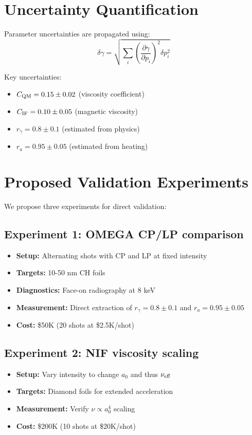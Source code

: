\documentclass[aps,pre,twocolumn,showpacs,superscriptaddress]{revtex4-2}
\theoremstyle{definition}
\begin{document}
\section{Uncertainty Quantification}\label{sec:uncertainty}

Parameter uncertainties are propagated using:
\begin{equation}
\delta\gamma = \sqrt{\sum_i \left(\frac{\partial\gamma}{\partial p_i}\right)^2 \delta p_i^2}
\end{equation}

Key uncertainties:
\begin{itemize}
\item $C_{\rm QM} = 0.15 \pm 0.02$ (viscosity coefficient)
\item $C_{\rm IF} = 0.10 \pm 0.05$ (magnetic viscosity)
\item $r_\gamma = 0.8 \pm 0.1$ (estimated from physics)
\item $r_a = 0.95 \pm 0.05$ (estimated from heating)
\end{itemize}

\section{Proposed Validation Experiments}\label{sec:proposed}

We propose three experiments for direct validation:

\subsection{Experiment 1: OMEGA CP/LP comparison}
\begin{itemize}
\item \textbf{Setup:} Alternating shots with CP and LP at fixed intensity
\item \textbf{Targets:} 10-50 nm CH foils
\item \textbf{Diagnostics:} Face-on radiography at 8 keV
\item \textbf{Measurement:} Direct extraction of $r_\gamma = 0.8 \pm 0.1$ and $r_a = 0.95 \pm 0.05$
\item \textbf{Cost:} \$50K (20 shots at \$2.5K/shot)
\end{itemize}

\subsection{Experiment 2: NIF viscosity scaling}
\begin{itemize}
\item \textbf{Setup:} Vary intensity to change $a_0$ and thus $\nu_{\rm eff}$
\item \textbf{Targets:} Diamond foils for extended acceleration
\item \textbf{Measurement:} Verify $\nu \propto a_0^4$ scaling
\item \textbf{Cost:} \$200K (10 shots at \$20K/shot)
\end{itemize}
\end{document}
